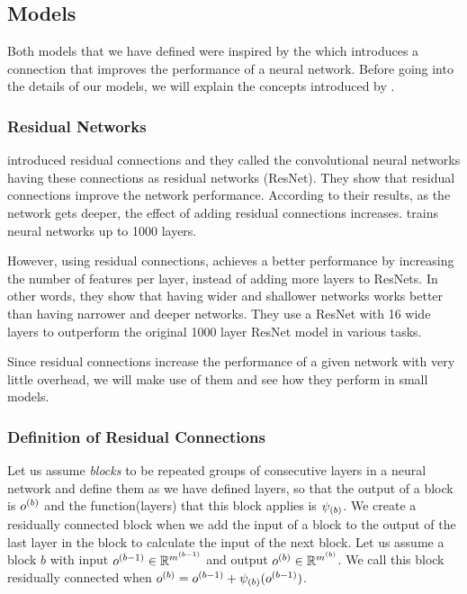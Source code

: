 \subsection{Models}
Both models that we have defined were inspired by the \cite{He:2015aa} which introduces a connection that improves the performance of a neural network. Before going into the details of our models, we will explain the concepts introduced by \cite{He:2015aa}.

\subsubsection{Residual Networks}
\cite{He:2015aa} introduced residual connections and they called the convolutional neural networks having these connections as residual networks (ResNet). They show that residual connections improve the network performance. According to their results, as the network gets deeper, the effect of adding residual connections increases. \cite{He:2015aa} trains neural networks up to 1000 layers.

However, using residual connections, \cite{Zagoruyko:2016aa} achieves a better performance by increasing the number of features per layer, instead of adding more layers to ResNets. In other words, they show that having wider and shallower networks works better than having narrower and deeper networks. They use a ResNet with 16 wide layers to outperform the original 1000 layer ResNet model in various tasks. 

Since residual connections increase the performance of a given network with very little overhead, we will make use of them and see how they perform in small models.

\subsubsection{Definition of Residual Connections}
Let us assume \textit{blocks} to be repeated groups of consecutive layers in a neural network and define them as we have defined layers, so that the output of a block is $o^{(b)}$ and the function(layers) that this block applies is $\psi_{(b)}$. We create a residually connected block when we add the input of a block to the output of the last layer in the block to calculate the input of the next block. Let us assume a block $b$ with input $o^{(b-1)} \in \mathbb{R}^{m^{(b-1)}}$ and output  $o^{(b)} \in \mathbb{R}^{m^{(b)}}$. We call this block residually connected when ${o^{(b)}} = o^{(b-1)} + \psi_{(b)}(o^{(b-1)})$. 

